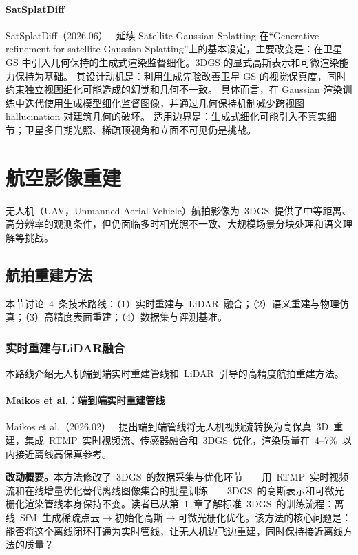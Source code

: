 \paragraph{SatSplatDiff}
SatSplatDiff（2026.06）~\cite{2606_27223} 延续 Satellite Gaussian Splatting 在“Generative refinement for satellite Gaussian Splatting”上的基本设定，主要改变是：在卫星 GS 中引入几何保持的生成式渲染监督细化。3DGS 的显式高斯表示和可微渲染能力保持为基础。
其设计动机是：利用生成先验改善卫星 GS 的视觉保真度，同时约束独立视图细化可能造成的幻觉和几何不一致。
具体而言，在 Gaussian 渲染训练中迭代使用生成模型细化监督图像，并通过几何保持机制减少跨视图 hallucination 对建筑几何的破坏。
适用边界是：生成式细化可能引入不真实细节；卫星多日期光照、稀疏顶视角和立面不可见仍是挑战。
\section{航空影像重建}
\label{sec:20_2}

无人机（UAV，Unmanned Aerial Vehicle）航拍影像为~3DGS~提供了中等距离、高分辨率的观测条件，但仍面临多时相光照不一致、大规模场景分块处理和语义理解等挑战。

\subsection{航拍重建方法}
\label{ss:20_3}

本节讨论~4~条技术路线：（1）实时重建与~LiDAR~融合；（2）语义重建与物理仿真；（3）高精度表面重建；（4）数据集与评测基准。

\subsubsection{实时重建与LiDAR融合}

本路线介绍无人机端到端实时重建管线和~LiDAR~引导的高精度航拍重建方法。

\paragraph{Maikos et al.：端到端实时重建管线}

Maikos et al.（2026.02）~\cite{2602_20342} 提出端到端管线将无人机视频流转换为高保真~3D~重建，集成~RTMP~实时视频流、传感器融合和~3DGS~优化，渲染质量在~4--7\%~以内接近离线高保真参考。

\textbf{改动概要。}本方法修改了~3DGS~的数据采集与优化环节——用~RTMP~实时视频流和在线增量优化替代离线图像集合的批量训练——3DGS~的高斯表示和可微光栅化渲染管线本身保持不变。读者已从第~1~章了解标准~3DGS~的训练流程：离线~SfM~生成稀疏点云$\to$初始化高斯$\to$可微光栅化优化。该方法的核心问题是：能否将这个离线闭环打通为实时管线，让无人机边飞边重建，同时保持接近离线方法的质量？

